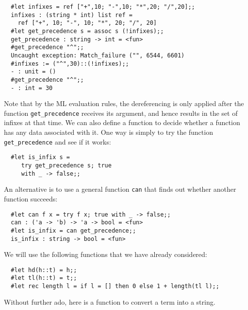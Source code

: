 \begin{boxed}\begin{verbatim}
  #let infixes = ref ["+",10; "-",10; "*",20; "/",20];;
  infixes : (string * int) list ref =
    ref ["+", 10; "-", 10; "*", 20; "/", 20]
  #let get_precedence s = assoc s (!infixes);;
  get_precedence : string -> int = <fun>
  #get_precedence "^";;
  Uncaught exception: Match_failure ("", 6544, 6601)
  #infixes := ("^",30)::(!infixes);;
  - : unit = ()
  #get_precedence "^";;
  - : int = 30
\end{verbatim}\end{boxed}

Note that by the ML evaluation rules, the dereferencing is only applied after
the function {\tt get\_precedence} receives its argument, and hence results in
the set of infixes at that time. We can also define a function to decide
whether a function has any data associated with it. One way is simply to try
the function {\tt get\_precedence} and see if it works:

\begin{boxed}\begin{verbatim}
  #let is_infix s =
     try get_precedence s; true
     with _ -> false;;
\end{verbatim}\end{boxed}

An alternative is to use a general function {\tt can} that finds out whether
another function succeeds:

\begin{boxed}\begin{verbatim}
  #let can f x = try f x; true with _ -> false;;
  can : ('a -> 'b) -> 'a -> bool = <fun>
  #let is_infix = can get_precedence;;
  is_infix : string -> bool = <fun>
\end{verbatim}\end{boxed}

\noindent We will use the following functions that we have already considered:

\begin{boxed}\begin{verbatim}
  #let hd(h::t) = h;;
  #let tl(h::t) = t;;
  #let rec length l = if l = [] then 0 else 1 + length(tl l);;
\end{verbatim}\end{boxed}

\noindent Without further ado, here is a function to convert a term into a
string.

